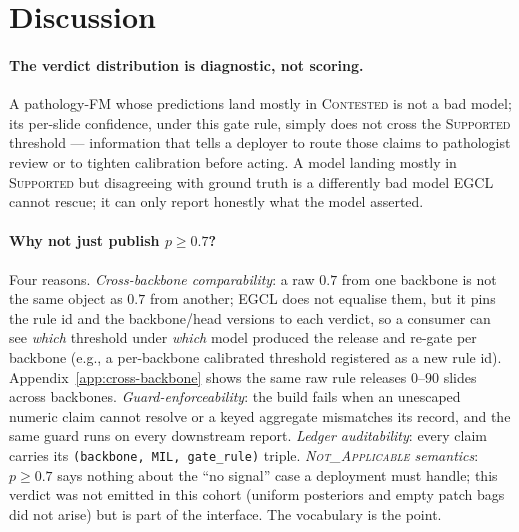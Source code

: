 \documentclass{article}
\newcommand{\SafeNum}[1]{#1}
\begin{document}
\section{Discussion}
\label{sec:discussion}

\paragraph{The verdict distribution is diagnostic, not scoring.} A pathology-FM whose predictions land mostly in \textsc{Contested} is not a bad model; its per-slide confidence, under this gate rule, simply does not cross the \textsc{Supported} threshold --- information that tells a deployer to route those claims to pathologist review or to tighten calibration before acting. A model landing mostly in \textsc{Supported} but disagreeing with ground truth is a differently bad model EGCL cannot rescue; it can only report honestly what the model asserted.

\paragraph{Why not just publish $p \ge \SafeNum{0.7}$?} Four reasons. \emph{Cross-backbone comparability}: a raw $\SafeNum{0.7}$ from one backbone is not the same object as $\SafeNum{0.7}$ from another; EGCL does not equalise them, but it pins the rule id and the backbone/head versions to each verdict, so a consumer can see \emph{which} threshold under \emph{which} model produced the release and re-gate per backbone (e.g., a per-backbone calibrated threshold registered as a new rule id). Appendix~\ref{app:cross-backbone} shows the same raw rule releases $\SafeNum{0}$--$\SafeNum{90}$ slides across backbones. \emph{Guard-enforceability}: the build fails when an unescaped numeric claim cannot resolve or a keyed aggregate mismatches its record, and the same guard runs on every downstream report. \emph{Ledger auditability}: every claim carries its \texttt{(backbone, MIL, gate\_rule)} triple. \emph{\textsc{Not\_Applicable} semantics}: $p \ge \SafeNum{0.7}$ says nothing about the ``no signal'' case a deployment must handle; this verdict was not emitted in this cohort (uniform posteriors and empty patch bags did not arise) but is part of the interface. The vocabulary is the point.
\end{document}

